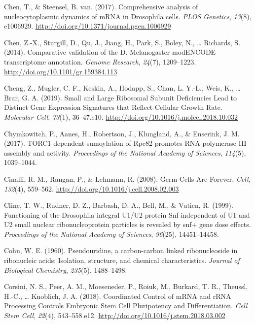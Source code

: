 \documentclass[12pt,oneside]{reedthesis}
\newlength{\cslhangindent}
\newenvironment{cslreferences}%
  {\setlength{\parindent}{0pt}%
  \everypar{\setlength{\hangindent}{\cslhangindent}}\ignorespaces}%
  {\par}
\begin{document}
\begin{cslreferences}
\leavevmode\hypertarget{ref-chenComprehensiveAnalysisNucleocytoplasmic2017}{}%
Chen, T., \& Steensel, B. van. (2017). Comprehensive analysis of nucleocytoplasmic dynamics of mRNA in Drosophila cells. \emph{PLOS Genetics}, \emph{13}(8), e1006929. \url{http://doi.org/10.1371/journal.pgen.1006929}

\leavevmode\hypertarget{ref-chenComparativeValidationMelanogaster2014}{}%
Chen, Z.-X., Sturgill, D., Qu, J., Jiang, H., Park, S., Boley, N., \ldots{} Richards, S. (2014). Comparative validation of the D. Melanogaster modENCODE transcriptome annotation. \emph{Genome Research}, \emph{24}(7), 1209--1223. \url{http://doi.org/10.1101/gr.159384.113}

\leavevmode\hypertarget{ref-chengSmallLargeRibosomal2019}{}%
Cheng, Z., Mugler, C. F., Keskin, A., Hodapp, S., Chan, L. Y.-L., Weis, K., \ldots{} Brar, G. A. (2019). Small and Large Ribosomal Subunit Deficiencies Lead to Distinct Gene Expression Signatures that Reflect Cellular Growth Rate. \emph{Molecular Cell}, \emph{73}(1), 36--47.e10. \url{http://doi.org/10.1016/j.molcel.2018.10.032}

\leavevmode\hypertarget{ref-Chymkowitch2017a}{}%
Chymkowitch, P., Aanes, H., Robertson, J., Klungland, A., \& Enserink, J. M. (2017). TORC1-dependent sumoylation of Rpc82 promotes RNA polymerase III assembly and activity. \emph{Proceedings of the National Academy of Sciences}, \emph{114}(5), 1039--1044.

\leavevmode\hypertarget{ref-Cinalli2008d}{}%
Cinalli, R. M., Rangan, P., \& Lehmann, R. (2008). Germ Cells Are Forever. \emph{Cell}, \emph{132}(4), 559--562. \url{http://doi.org/10.1016/j.cell.2008.02.003}

\leavevmode\hypertarget{ref-Cline1999}{}%
Cline, T. W., Rudner, D. Z., Barbash, D. A., Bell, M., \& Vutien, R. (1999). Functioning of the Drosophila integral U1/U2 protein Snf independent of U1 and U2 small nuclear ribonucleoprotein particles is revealed by snf+ gene dose effects. \emph{Proceedings of the National Academy of Sciences}, \emph{96}(25), 14451--14458.

\leavevmode\hypertarget{ref-Cohn1960}{}%
Cohn, W. E. (1960). Pseudouridine, a carbon-carbon linked ribonucleoside in ribonucleic acids: Isolation, structure, and chemical characteristics. \emph{Journal of Biological Chemistry}, \emph{235}(5), 1488--1498.

\leavevmode\hypertarget{ref-corsiniCoordinatedControlMRNA2018}{}%
Corsini, N. S., Peer, A. M., Moeseneder, P., Roiuk, M., Burkard, T. R., Theussl, H.-C., \ldots{} Knoblich, J. A. (2018). Coordinated Control of mRNA and rRNA Processing Controls Embryonic Stem Cell Pluripotency and Differentiation. \emph{Cell Stem Cell}, \emph{22}(4), 543--558.e12. \url{http://doi.org/10.1016/j.stem.2018.03.002}


\end{cslreferences}
\end{document}
